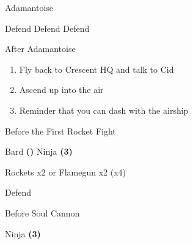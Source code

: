 \begin{paracol}{2}
\begin{boss}{Adamantoise}
	\varwb
	\begin{round}{1}
		\faris Defend
        \galuf Defend
        \lenna Defend
        \bartz \leftCommand{\blue} \then \lfiveDeath
	\end{round}
	\varwe
\end{boss}

\switchcolumn
\begin{steproute}{After Adamantoise}
\end{steproute}

\switchcolumn
\begin{enumerate}[resume]
    \item Fly back to Crescent HQ and talk to Cid
    \item Ascend up into the air
    \item Reminder that you can dash with the airship
\end{enumerate}

\begin{menu}{Before the First Rocket Fight}
    \varwb
    \begin{jobMenu}
        \bartz Bard \textbf{(\pointUp)} \ability{!\black}
        \lenna Ninja \textbf{(3\pointRight)} \ability{!\black}
    \end{jobMenu}
    \varwe
\end{menu}

\newpage

\begin{encounter}{Rockets x2 or Flamegun x2 (x4)}
	\varwb
	\begin{notes}
		\item {}
	\end{notes}
	\begin{round}{1}
		\faris \leftCommand{\throw} \then \thunderScroll
        \galuf Defend
        \lenna \leftCommand{\throw} \then \thunderScroll
        \bartz \rightCommand{\black} \then \bolt \space \then {}
	\end{round}
	\varwe
\end{encounter}

\begin{menu}{Before Soul Cannon}
    \varwb
    \begin{jobMenu}
        \galuf Ninja \textbf{(3\pointRight)} \ability{!\white}
    \end{jobMenu}
    \varwe
\end{menu}


\end{paracol}
